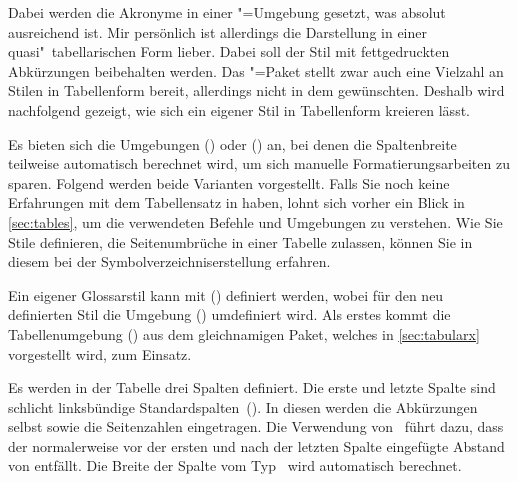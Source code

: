 \documentclass[%
  english,ngerman,%
  cdgeometry=no,DIV=12,%
  cd=false,cdfont=false,cdtitle=true,%
  headings=normal,%
  automark,%
  listof=toc,%
]{tudscrartcl}
\begin{document}
\begin{quoting}[rightmargin=0pt]
\glsdisablehyper
\printacronyms[style=simple]
\end{quoting}
%
Dabei werden die Akronyme in einer "=Umgebung gesetzt,
was absolut ausreichend ist. Mir persönlich ist allerdings die Darstellung in 
einer quasi"~tabellarischen Form lieber. Dabei soll der Stil mit fettgedruckten 
Abkürzungen beibehalten werden. Das "=Paket stellt zwar 
auch eine Vielzahl an Stilen in Tabellenform bereit, allerdings nicht in dem 
gewünschten. Deshalb wird nachfolgend gezeigt, wie sich ein eigener Stil in 
Tabellenform kreieren lässt.

Es bieten sich die Umgebungen () oder 
() an, bei denen die Spaltenbreite teilweise 
automatisch berechnet wird, um sich manuelle Formatierungsarbeiten zu sparen. 
Folgend werden beide Varianten vorgestellt. Falls Sie noch keine Erfahrungen 
mit dem Tabellensatz in  haben, lohnt sich vorher ein Blick in 
\autoref{sec:tables}, um die verwendeten Befehle und Umgebungen zu verstehen. 
Wie Sie Stile definieren, die Seitenumbrüche in einer Tabelle zulassen, können 
Sie in diesem  bei der Symbolverzeichniserstellung 
erfahren.

Ein eigener Glossarstil kann mit () 
definiert werden, wobei für den neu definierten Stil die Umgebung 
() umdefiniert wird. Als erstes 
kommt die Tabellenumgebung () aus dem 
gleichnamigen Paket, welches in \autoref{sec:tabularx} vorgestellt wird, zum 
Einsatz.

Es werden in der Tabelle drei Spalten definiert. Die erste und letzte Spalte 
sind schlicht linksbündige Standardspalten~(). In diesen werden die 
Abkürzungen selbst sowie die Seitenzahlen eingetragen. Die Verwendung 
von~ führt dazu, dass der normalerweise vor der ersten 
und nach der letzten Spalte eingefügte Abstand von  entfällt. 
Die Breite der Spalte vom Typ~ wird automatisch berechnet.
\end{document}
